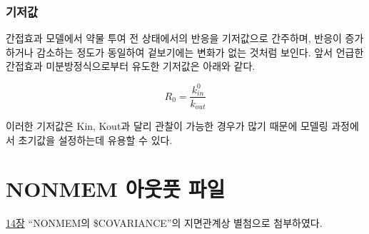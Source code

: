 \documentclass[
  11pt,
  krantz2,
  a4paper]{krantz}
\theoremstyle{definition}
\theoremstyle{definition}
\theoremstyle{definition}
\theoremstyle{remark}
\begin{document}
\hypertarget{uxae30uxc800uxac12}{%
\subsection{기저값}\label{uxae30uxc800uxac12}}

간접효과 모델에서 약물 투여 전 상태에서의 반응을 기저값으로 간주하며, 반응이 증가하거나 감소하는 정도가 동일하여 겉보기에는 변화가 없는 것처럼 보인다. 앞서 언급한 간접효과 미분방정식으로부터 유도한 기저값은 아래와 같다.

\begin{equation}
R_{0} = \frac{k_{in}^0}{k_{out}}
\label{eq:baseline}
\end{equation}

이러한 기저값은 Kin, Kout과 달리 관찰이 가능한 경우가 많기 때문에 모델링 과정에서 초기값을 설정하는데 유용할 수 있다.

\cleardoublepage

\hypertarget{appendix-uxbcc4uxcca8}{%
\appendix {}}


\hypertarget{nonmem-uxc544uxc6c3uxd48b-uxd30cuxc77c}{%
\chapter{NONMEM 아웃풋 파일}\label{nonmem-uxc544uxc6c3uxd48b-uxd30cuxc77c}}

\protect\hyperlink{cov}{14장} ``NONMEM의 \$COVARIANCE''의 지면관계상 별첨으로 첨부하였다.

\tiny
\end{document}
